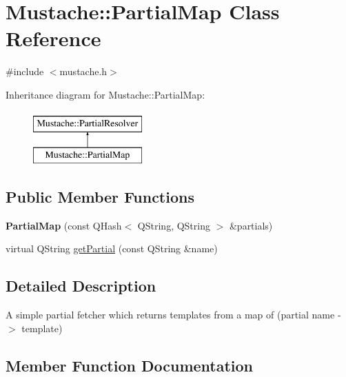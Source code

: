 \hypertarget{classMustache_1_1PartialMap}{}\section{Mustache\+:\+:Partial\+Map Class Reference}
\label{classMustache_1_1PartialMap}


{\ttfamily \#include $<$mustache.\+h$>$}

Inheritance diagram for Mustache\+:\+:Partial\+Map\+:\begin{figure}[H]
\begin{center}
\leavevmode
\includegraphics[height=2.000000cm]{dc/d1a/classMustache_1_1PartialMap}
\end{center}
\end{figure}
\subsection*{Public Member Functions}
\begin{DoxyCompactItemize}
\item 
\hypertarget{classMustache_1_1PartialMap_a6b03a962390f637625af4b194b0504b8}{}{\bfseries Partial\+Map} (const Q\+Hash$<$ Q\+String, Q\+String $>$ \&partials)\label{classMustache_1_1PartialMap_a6b03a962390f637625af4b194b0504b8}

\item 
virtual Q\+String \hyperlink{classMustache_1_1PartialMap_a676a6f9a77cdd53e91b18216733b2781}{get\+Partial} (const Q\+String \&name)
\end{DoxyCompactItemize}


\subsection{Detailed Description}
A simple partial fetcher which returns templates from a map of (partial name -\/$>$ template) 

\subsection{Member Function Documentation}
\hypertarget{classMustache_1_1PartialMap_a676a6f9a77cdd53e91b18216733b2781}{}

